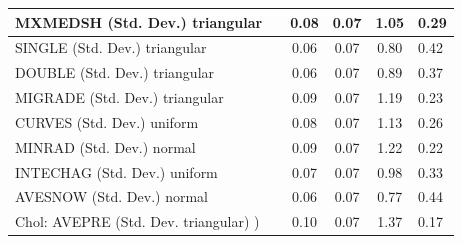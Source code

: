 \begin{table}
\begin{center}
\begin{tabular}{|l|l|c|c|c|l|}
			\hline
			MXMEDSH (Std. Dev.) triangular &  & 0.08 & 0.07 & 1.05 & 0.29 \\
			\hline
			SINGLE (Std. Dev.) triangular &  & 0.06 & 0.07 & 0.80 & 0.42 \\
			\hline
			DOUBLE (Std. Dev.) triangular &  & 0.06 & 0.07 & 0.89 & 0.37 \\
			\hline
			MIGRADE (Std. Dev.) triangular &  & 0.09 & 0.07 & 1.19 & 0.23 \\
			\hline
			CURVES (Std. Dev.) uniform &  & 0.08 & 0.07 & 1.13 & 0.26 \\
			\hline
			MINRAD (Std. Dev.) normal &  & 0.09 & 0.07 & 1.22 & 0.22 \\
			\hline
			INTECHAG (Std. Dev.) uniform &  & 0.07 & 0.07 & 0.98 & 0.33 \\
			\hline
			AVESNOW (Std. Dev.) normal &  & 0.06 & 0.07 & 0.77 & 0.44 \\
			\hline
			 Chol: AVEPRE (Std. Dev. triangular) ) &  & 0.10 & 0.07 & 1.37 & 0.17 \\
			\hline
		\end{tabular}
	\end{center}
\end{table}